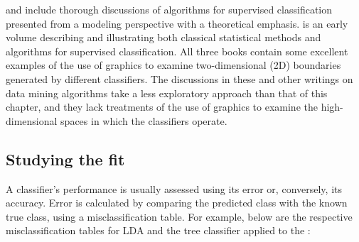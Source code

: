  and  include thorough discussions of
algorithms for supervised classification presented from a modeling
perspective with a theoretical emphasis.  is an early
volume describing and illustrating both classical statistical methods
and algorithms for supervised classification. All three books contain
some excellent examples of the use of graphics to examine
two-dimensional (2D) boundaries generated by different
classifiers. The discussions in these and other writings on data
mining algorithms take a less exploratory approach than that of this
chapter, and they lack treatments of the use of graphics to examine
the high-dimensional spaces in which the classifiers operate.

\subsection{Studying the fit}


A classifier's performance is usually assessed using its error or,
conversely, its accuracy. Error is calculated by comparing the
predicted class with the known true class, using a misclassification
table. For example, below are the respective misclassification tables
for LDA and the tree classifier applied to the :

